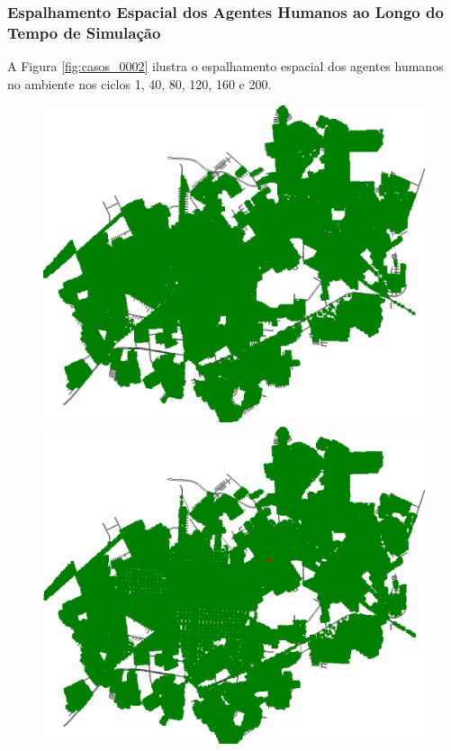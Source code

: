 \newpage

\subsubsection{Espalhamento Espacial dos Agentes Humanos ao Longo do Tempo de Simulação}

A Figura \ref{fig:casos_0002} ilustra o espalhamento espacial dos agentes humanos no ambiente nos ciclos 1, 40, 80, 120, 160 e 200.

\begin{figure}[H]
  \centering
  \begin{minipage}{.5\textwidth}
    \centering
    \includegraphics[width=1.0\textwidth]{Figuras/Resultados/0002/Saidas/MonteCarlo_0/Simulacao_0/Espacial/00000.png}
    \captionsetup{labelformat=empty}
  \end{minipage}%
  \begin{minipage}{.5\textwidth}
    \centering
    \includegraphics[width=1.0\textwidth]{Figuras/Resultados/0002/Saidas/MonteCarlo_0/Simulacao_0/Espacial/00004.png}

\end{minipage}
\end{figure}
